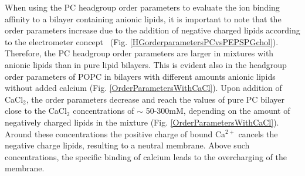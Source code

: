 \documentclass[journal=jpcbfk]{achemso}
\begin{document}
When using the PC headgroup order parameters to evaluate the ion binding affinity to a bilayer containing anionic lipids,
it is important to note that the order parameters
increase due to the addition of negative charged lipids according to the electrometer
concept~\cite{seelig87, scherer87} (Fig. \ref{HGorderparametersPCvsPEPSPGchol}).
Therefore, the PC headgroup order parameters are larger in mixtures with anionic lipids
than in pure lipid bilayers. This is evident also in the headgroup order parameters
of POPC in bilayers with different amounts anionic lipids without added calcium (Fig. \ref{OrderParametersWithCaCl}).
Upon addition of CaCl$_2$, the order parameters decrease and reach the values of pure PC bilayer close 
to the CaCl$_2$ concentrations of $\sim$ 50-300mM, depending on the amount of negatively charged
lipids in the mixture (Fig. \ref{OrderParametersWithCaCl}).
Around these concentrations the positive charge of bound Ca$^{2+}$ cancels
the negative charge lipids, resulting to a neutral membrane. 
Above such concentrations, the specific binding of calcium leads to
the overcharging of the membrane.
\end{document}
